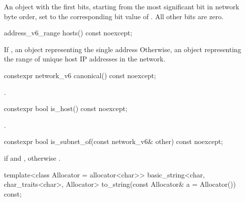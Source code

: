 \begin{itemdescr}
\pnum
\returns An  object with the first  bits, starting from the most significant bit in network byte order, set to the corresponding bit value of . All other bits are zero.
\end{itemdescr}

\begin{itemdecl}
address_v6_range hosts() const noexcept;
\end{itemdecl}

\begin{itemdescr}
\pnum
\returns If , an  object representing the single address  Otherwise, an  object representing the range of unique host IP addresses in the network.
\end{itemdescr}

\begin{itemdecl}
constexpr network_v6 canonical() const noexcept;
\end{itemdecl}

\begin{itemdescr}
\pnum
\returns {}.
\end{itemdescr}

\begin{itemdecl}
constexpr bool is_host() const noexcept;
\end{itemdecl}

\begin{itemdescr}
\pnum
\returns {}.
\end{itemdescr}

\begin{itemdecl}
constexpr bool is_subnet_of(const network_v6& other) const noexcept;
\end{itemdecl}

\begin{itemdescr}
\pnum
\returns {} if  and , otherwise .
\end{itemdescr}

\begin{itemdecl}
template<class Allocator = allocator<char>>
  basic_string<char, char_traits<char>, Allocator>
    to_string(const Allocator& a = Allocator()) const;
\end{itemdecl}

